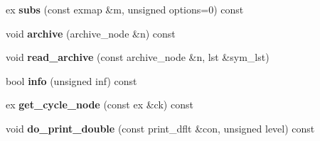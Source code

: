\begin{DoxyCompactItemize}
\mbox{\label{class_moeb_inv_1_1figure_ac2b38f061d3125b11adda821698b95dd}} 
ex {\bfseries subs} (const exmap \&m, unsigned options=0) const
\item 
\mbox{\label{class_moeb_inv_1_1figure_a947540d1cdd36573716aaad9755cb14a}} 
void {\bfseries archive} (archive\+\_\+node \&n) const
\item 
\mbox{\label{class_moeb_inv_1_1figure_a6550d2bbdf8b71b942a7f2b38e16ee7b}} 
void {\bfseries read\+\_\+archive} (const archive\+\_\+node \&n, lst \&sym\+\_\+lst)
\item 
\mbox{\label{class_moeb_inv_1_1figure_a5821cfff25a0f64069a9ade4ed2e0836}} 
bool {\bfseries info} (unsigned inf) const
\item 
\mbox{\label{class_moeb_inv_1_1figure_a556b55595bd5737909946e2f98b3e081}} 
ex {\bfseries get\+\_\+cycle\+\_\+node} (const ex \&ck) const
\item 
\mbox{\label{class_moeb_inv_1_1figure_a8a759812f57a57d752edb9b5b96a97ce}} 
void {\bfseries do\+\_\+print\+\_\+double} (const print\+\_\+dflt \&con, unsigned level) const
\end{DoxyCompactItemize}
